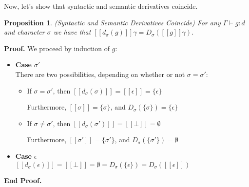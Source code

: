 \documentclass{article}
\newcommand{\judgebalance}[3][\Gamma]{{#1} \vdash {#2} : {#3}}
\newcommand{\interp}[1]{[\![{#1}]\!]}
\newcommand{\setof}[1]{\{{#1}\}}
\newcommand{\semderiv}[2]{D_{#1}({#2})}
\newcommand{\deriv}[2]{d_{#1}({#2})}
\newtheorem{prop}{Proposition}
\newenvironment{proof}{\noindent\textbf{Proof.}}{\noindent\textbf{End Proof.}}
\newenvironment{caseblock}{\begin{itemize}}{\end{itemize}}
\newenvironment{case}[1]{\item \textbf{Case} {#1}\\}{}
\begin{document}
Now, let's show that syntactic and semantic derivatives coincide. 

\begin{prop}{(Syntactic and Semantic Derivatives Coincide)}
For any  $\judgebalance{g}{d}$ and character $\sigma$ we have that
$\interp{\deriv{\sigma}{g}}\gamma = \semderiv{\sigma}{\interp{g}\gamma}$.
\end{prop}

\begin{proof}
  We proceed by induction of $g$: 

  \begin{caseblock}
    \begin{case}{$\sigma'$}
      There are two possibilities, depending on whether or not $\sigma = \sigma'$: 
      \begin{itemize}
        \item If $\sigma = \sigma'$, then $\interp{\deriv{\sigma}{\sigma}} = \interp{\epsilon} = \setof{\epsilon}$

          Furthermore, $\interp{\sigma} = \setof{\sigma}$, and $\semderiv{\sigma}{\setof{\sigma}} = \setof{\epsilon}$
        \item If $\sigma \not= \sigma'$, then $\interp{\deriv{\sigma}{\sigma'}} = \interp{\bot} = \emptyset$
          
          Furthermore, $\interp{\sigma'} = \setof{\sigma'}$, and $\semderiv{\sigma}{\setof{\sigma'}} = \emptyset$
      \end{itemize}
    \end{case}

    \begin{case}{$\epsilon$}
      $\interp{\deriv{\sigma}{\epsilon}} = \interp{\bot} = \emptyset = \semderiv{\sigma}{\setof{\epsilon}} = \semderiv{\sigma}{\interp{\epsilon}}$
    \end{case}


\end{caseblock}
\end{proof}
\end{document}
